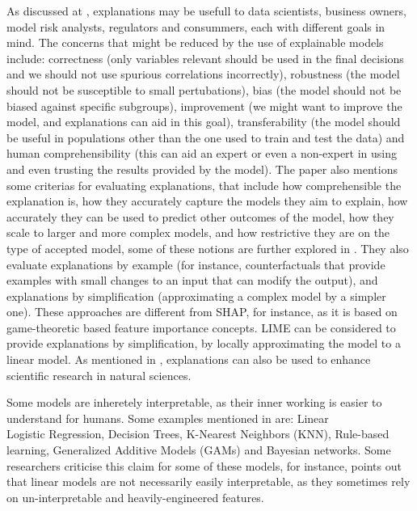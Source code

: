 As discussed at \cite{Principles and Practice of Explainable Machine Learning}, explanations may be usefull to data scientists, business owners, model risk analysts, regulators and consummers, each with different goals in mind. The concerns that might be reduced by the use of explainable models include: correctness (only variables relevant should be used in the final decisions and we should not use spurious correlations incorrectly), robustness (the model should not be susceptible to small pertubations), bias (the model should not be biased against specific subgroups), improvement (we might want to improve the model, and explanations can aid in this goal), transferability (the model should be useful in populations other than the one used to train and test the data) and human comprehensibility (this can aid an expert or even a non-expert in using and even trusting the results provided by the model). The paper also mentions some criterias for evaluating explanations, that include how comprehensible the explanation is, how they accurately capture the models they aim to explain, how accurately they can be used to predict other outcomes of the model, how they scale to larger and more complex models, and how restrictive they are on the type of accepted model, some of these notions are further explored in \cite{Machine Learning Interpretability: A Survey on Methods and Metrics}. They also evaluate explanations by example (for instance, counterfactuals \cite{CounterExplain} that provide examples with small changes to an input that can modify the output), and explanations by simplification (approximating a complex model by a simpler one). These approaches are different from SHAP, for instance, as it is based on game-theoretic based feature importance concepts. LIME can be considered to provide explanations by simplification, by locally approximating the model to a linear model. As mentioned in \cite{Explainable Machine Learning for Scientific Insights and Discoveries}, explanations can also be used to enhance scientific research in natural sciences.

Some models are inheretely interpretable, as their inner working is easier to understand for humans. Some examples mentioned in \cite{Principles and Practice of Explainable Machine Learning} are: Linear\\Logistic Regression, Decision Trees, K-Nearest Neighbors (KNN), Rule-based learning, Generalized Additive Models (GAMs) and Bayesian networks. Some researchers criticise this claim for some of these models, for instance, \cite{The mythos of model interpretability: In machine learning, the concept of interpretability is both important and slippery} points out that linear models are not necessarily easily interpretable, as they sometimes rely on un-interpretable and heavily-engineered features.

